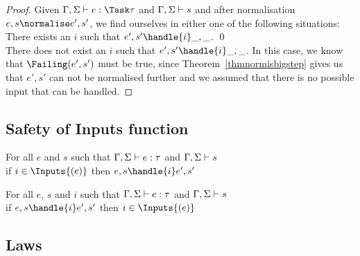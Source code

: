 \begin{proof}
  Given $\Gamma,\Sigma\infers e:\Task\tau$ and $\Gamma,\Sigma\vdash s$ and after
  normalisation $e,s \normalise e',s'$, we find ourselves in either one of the
  following situations:\\

  There exists an $i$ such that $e',s'\handle{i}\_,\_$. \qed\\

  There does not exist an $i$ such that $e',s'\handle{i}\_,\_$. In this case, we
  know that $\Failing(e',s')$ must be true, since Theorem~\ref{thmnormisbigstep}
  gives us that $e',s'$ can not be normalised further and we assumed that there
  is no possible input that can be handled.
\end{proof}





\subsection{Safety of Inputs function}

\begin{theorem}
  For all $e$ and $s$ such that $\Gamma,\Sigma\vdash e:\tau$ and $\Gamma,\Sigma\vdash s$\\
  if $i\in\Inputs{(e)}$ then $e,s\handle{i}e',s'$
  \label{thmsafetyi1}
\end{theorem}

\begin{theorem}
  For all $e$, $s$ and $i$ such that $\Gamma,\Sigma\vdash e:\tau$ and $\Gamma,\Sigma\vdash s$\\
  if $e,s\handle{i}e',s'$ then  $i\in\Inputs{(e)}$
  \label{thmsafetyi2}
\end{theorem}
\subsection{Laws}
